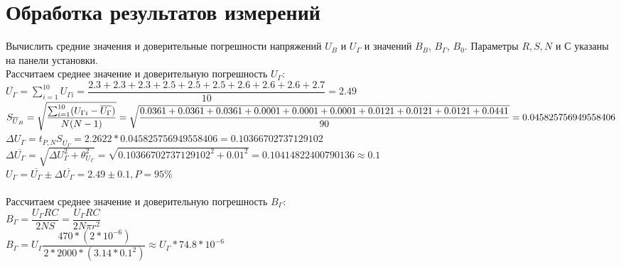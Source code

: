\section*{Обработка результатов измерений}

Вычислить средние значения и доверительные погрешности напряжений $U_B$ и $U_{\Gamma}$ и
значений $ B_B $, $ B_\Gamma $, $ B_0 $. Параметры $ R, S, N $ и $ С $ указаны на панели установки.
\ \\ 

Рассчитаем среднее значение и доверительную погрешность $ U_\Gamma $:\\

$ 
\overline{U_{\Gamma}}= 
\sum_{i=1}^{10} U_{\Gamma i} = 
\dfrac{2.3 + 2.3 + 2.3 + 2.5 + 2.5 + 2.5 + 2.6 + 2.6 + 2.6 + 2.7}{10} 
= 2.49
$
\\

$
S_{\overline U_B} = 
\sqrt{
	\dfrac
	{
		\sum_{i=1}^{10}(U_{\Gamma i} - \overline{U_{\Gamma}})
	}
	{
		N(N-1)
	}
}
=\\
\sqrt{
	\dfrac
	{
		0.0361 + 0.0361 + 0.0361 + 0.0001 + 0.0001 + 0.0001 + 0.0121 + 0.0121 + 0.0121 + 0.0441
	}
	{
		90
	}
}
=\\
0.045825756949558406
$
\\

$ 
\varDelta U_{\Gamma} = 
t_{P,N}S_{\overline{U_{\Gamma}}} = 
2.2622 * 0.045825756949558406 = 
0.10366702737129102
$
\\

$ 
\varDelta \overline{U_{\Gamma}} = 
\sqrt{\varDelta U_{\Gamma}^2 + \theta_{U_{\Gamma}}^2} =
\sqrt{0.10366702737129102^2 + 0.01^2} = 
0.10414822400790136 \approx 
0.1
$
\\

$ U_{\Gamma} = 
\overline{U_{\Gamma}} \pm \varDelta \overline{U_{\Gamma}} = 
2.49 \pm 0.1, P = 95\%
$
\\

\ \\ 

Рассчитаем среднее значение и доверительную погрешность $ B_\Gamma $:\\

$ B_\Gamma = \dfrac{U_\Gamma RC}{2NS} = \dfrac{U_\Gamma RC}{2N\pi r^2} $
\\

$ B_\Gamma = U_\Gamma \dfrac{470 * (2 * 10^{-6})}{2 * 2000 * (3.14 * 0.1^2)} \approx U_\Gamma * 74.8 * 10^{-6} $
\\

